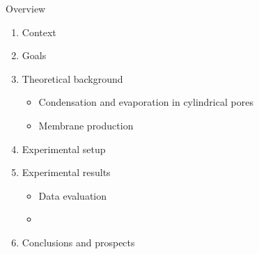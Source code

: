 \documentclass[../defence.tex]{subfiles}
\begin{document}
  \begin{frame}{Overview}
      \begin{enumerate}
        \item Context
        \item Goals
        \item Theoretical background\\
          \begin{itemize}
            \item Condensation and evaporation in cylindrical pores
            \item Membrane production
          \end{itemize}
        \item Experimental setup
        \item Experimental results
          \begin{itemize}
            \item Data evaluation
            \item
          \end{itemize}
        \item Conclusions and prospects
      \end{enumerate}
  \end{frame}
\end{document}
